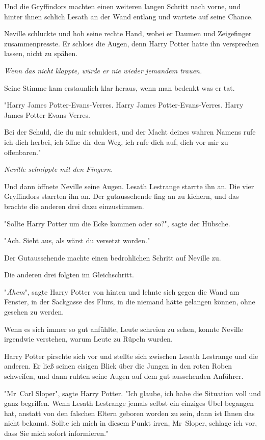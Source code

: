 {Und die Gryffindors machten einen weiteren langen Schritt nach vorne, und hinter ihnen schlich Lesath an der Wand entlang und wartete auf seine Chance.

Neville schluckte und hob seine rechte Hand, wobei er Daumen und Zeigefinger zusammenpresste. Er schloss die Augen, denn Harry Potter hatte ihn versprechen lassen, nicht zu spähen.

\emph{Wenn das nicht klappte, würde er nie wieder jemandem trauen.}

Seine Stimme kam erstaunlich klar heraus, wenn man bedenkt was er tat.

"Harry James Potter-Evans-Verres. Harry James Potter-Evans-Verres. Harry James Potter-Evans-Verres.

Bei der Schuld, die du mir schuldest, und der Macht deines wahren Namens rufe ich dich herbei, ich öffne dir den Weg, ich rufe dich auf, dich vor mir zu offenbaren."

\emph{Neville schnippte mit den Fingern.}

Und dann öffnete Neville seine Augen. Lesath Lestrange starrte ihn an. Die vier Gryffindors starrten ihn an. Der gutaussehende fing an zu kichern, und das brachte die anderen drei dazu einzustimmen.

"Sollte Harry Potter um die Ecke kommen oder so?", sagte der Hübsche.

"Ach. Sieht aus, als wärst du versetzt worden."

Der Gutaussehende machte einen bedrohlichen Schritt auf Neville zu.

Die anderen drei folgten im Gleichschritt.

"\emph{Ähem}", sagte Harry Potter von hinten und lehnte sich gegen die Wand am Fenster, in der Sackgasse des Flurs, in die niemand hätte gelangen können, ohne gesehen zu werden.

Wenn es sich immer so gut anfühlte, Leute schreien zu sehen, konnte Neville irgendwie verstehen, warum Leute zu Rüpeln wurden.

Harry Potter pirschte sich vor und stellte sich zwischen Lesath Lestrange und die anderen. Er ließ seinen eisigen Blick über die Jungen in den roten Roben schweifen, und dann ruhten seine Augen auf dem gut aussehenden Anführer.

"Mr~Carl Sloper", sagte Harry Potter. "Ich glaube, ich habe die Situation voll und ganz begriffen. Wenn Lesath Lestrange jemals selbst ein einziges Übel begangen hat, anstatt von den falschen Eltern geboren worden zu sein, dann ist Ihnen das nicht bekannt. Sollte ich mich in diesem Punkt irren, Mr~Sloper, schlage ich vor, dass Sie mich sofort informieren."

}
